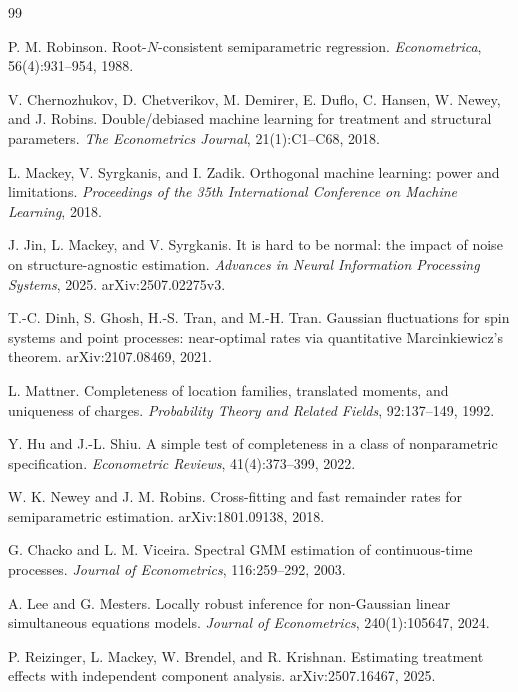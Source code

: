 \documentclass{article}
\begin{document}
\begin{thebibliography}{99}

   P. M. Robinson. Root-\(N\)-consistent semiparametric regression. \emph{Econometrica}, 56(4):931--954, 1988.

   V. Chernozhukov, D. Chetverikov, M. Demirer, E. Duflo, C. Hansen, W. Newey, and J. Robins. Double/debiased machine learning for treatment and structural parameters. \emph{The Econometrics Journal}, 21(1):C1--C68, 2018.

   L. Mackey, V. Syrgkanis, and I. Zadik. Orthogonal machine learning: power and limitations. \emph{Proceedings of the 35th International Conference on Machine Learning}, 2018.

   J. Jin, L. Mackey, and V. Syrgkanis. It is hard to be normal: the impact of noise on structure-agnostic estimation. \emph{Advances in Neural Information Processing Systems}, 2025. arXiv:2507.02275v3.

   T.-C. Dinh, S. Ghosh, H.-S. Tran, and M.-H. Tran. Gaussian fluctuations for spin systems and point processes: near-optimal rates via quantitative Marcinkiewicz's theorem. arXiv:2107.08469, 2021.

   L. Mattner. Completeness of location families, translated moments, and uniqueness of charges. \emph{Probability Theory and Related Fields}, 92:137--149, 1992.

   Y. Hu and J.-L. Shiu. A simple test of completeness in a class of nonparametric specification. \emph{Econometric Reviews}, 41(4):373--399, 2022.

   W. K. Newey and J. M. Robins. Cross-fitting and fast remainder rates for semiparametric estimation. arXiv:1801.09138, 2018.

   G. Chacko and L. M. Viceira. Spectral GMM estimation of continuous-time processes. \emph{Journal of Econometrics}, 116:259--292, 2003.

   A. Lee and G. Mesters. Locally robust inference for non-Gaussian linear simultaneous equations models. \emph{Journal of Econometrics}, 240(1):105647, 2024.

   P. Reizinger, L. Mackey, W. Brendel, and R. Krishnan. Estimating treatment effects with independent component analysis. arXiv:2507.16467, 2025.

\end{thebibliography}
\end{document}
